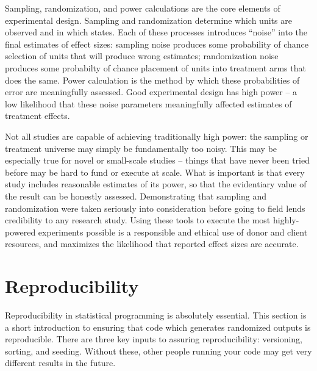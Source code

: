 
\begin{fullwidth}
Sampling, randomization, and power calculations are the core elements of experimental design.
Sampling and randomization determine which units are observed and in which states.
Each of these processes introduces ``noise'' into the final estimates of effect sizes:
sampling noise produces some probability of chance selection of units that will produce wrong estimates;
randomization noise produces some probabilty of chance placement of units into treatment arms that does the same.
Power calculation is the method by which these probabilities of error are meaningfully assessed.
Good experimental design has high power -- a low likelihood that these noise parameters meaningfully affected estimates of treatment effects.

Not all studies are capable of achieving traditionally high power:
the sampling or treatment universe may simply be fundamentally too noisy.
This may be especially true for novel or small-scale studies --
things that have never been tried before may be hard to fund or execute at scale.
What is important is that every study includes reasonable estimates of its power,
so that the evidentiary value of the result can be honestly assessed.
Demonstrating that sampling and randomization were taken seriously into consideration
before going to field lends credibility to any research study.
Using these tools to execute the most highly-powered experiments possible
is a responsible and ethical use of donor and client resources,
and maximizes the likelihood that reported effect sizes are accurate.
\end{fullwidth}

\section{Reproducibility}

Reproducibility in statistical programming is absolutely essential.\cite{orozco2018make}
This section is a short introduction to ensuring that code
which generates randomized outputs is reproducible.
There are three key inputs to assuring reproducibility:
versioning, sorting, and seeding.
Without these, other people running your code may get very different results in the future.

